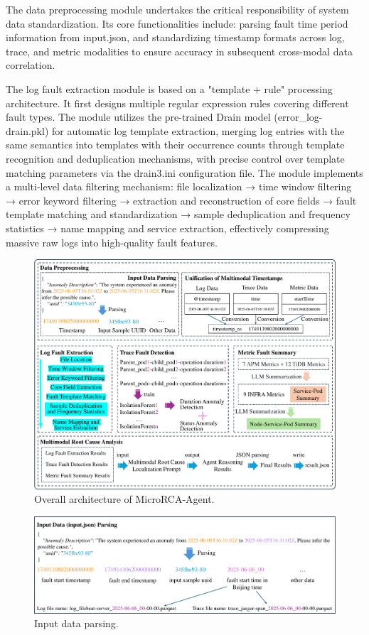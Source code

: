 \documentclass[10pt]{article}
\begin{document}
The data preprocessing module undertakes the critical responsibility of system data standardization. Its core functionalities include: parsing fault time period information from input.json, and standardizing timestamp formats across log, trace, and metric modalities to ensure accuracy in subsequent cross-modal data correlation.

The log fault extraction module is based on a "template + rule" processing architecture. It first designs multiple regular expression rules covering different fault types. The module utilizes the pre-trained Drain model\cite{he2017drain} (error\_log-drain.pkl) for automatic log template extraction, merging log entries with the same semantics into templates with their occurrence counts through template recognition and deduplication mechanisms, with precise control over template matching parameters via the drain3.ini configuration file. The module implements a multi-level data filtering mechanism: file localization → time window filtering → error keyword filtering → extraction and reconstruction of core fields → fault template matching and standardization → sample deduplication and frequency statistics → name mapping and service extraction, effectively compressing massive raw logs into high-quality fault features.

\begin{figure}[t]
    \centering
    \includegraphics[width=0.95\linewidth]{fig1.pdf}
    \caption{Overall architecture of MicroRCA-Agent.}
    \label{fig1}
\end{figure}

\begin{figure}[htbp]
    \centering
    \includegraphics[width=0.95\linewidth]{fig2.pdf}
    \caption{Input data parsing.}
    \label{fig2}
\end{figure}
\end{document}
